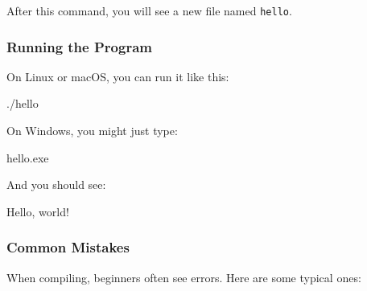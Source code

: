 \documentclass[
  letterpaper,
  DIV=11,
  numbers=noendperiod]{scrreprt}
\newenvironment{Shaded}{\begin{snugshade}}{\end{snugshade}}
\newcommand{\ExtensionTok}[1]{\textcolor[rgb]{0.00,0.23,0.31}{#1}}
\newcommand{\NormalTok}[1]{\textcolor[rgb]{0.00,0.23,0.31}{#1}}
\begin{document}
After this command, you will see a new file named \texttt{hello}.

\subsubsection{Running the Program}\label{running-the-program}

On Linux or macOS, you can run it like this:

\begin{Shaded}
\begin{Highlighting}[]
\ExtensionTok{./hello}
\end{Highlighting}
\end{Shaded}

On Windows, you might just type:

\begin{Shaded}
\begin{Highlighting}[]
\ExtensionTok{hello.exe}
\end{Highlighting}
\end{Shaded}

And you should see:

\begin{Shaded}
\begin{Highlighting}[]
\ExtensionTok{Hello,}\NormalTok{ world!}
\end{Highlighting}
\end{Shaded}

\subsubsection{Common Mistakes}\label{common-mistakes}

When compiling, beginners often see errors. Here are some typical ones:
\end{document}
